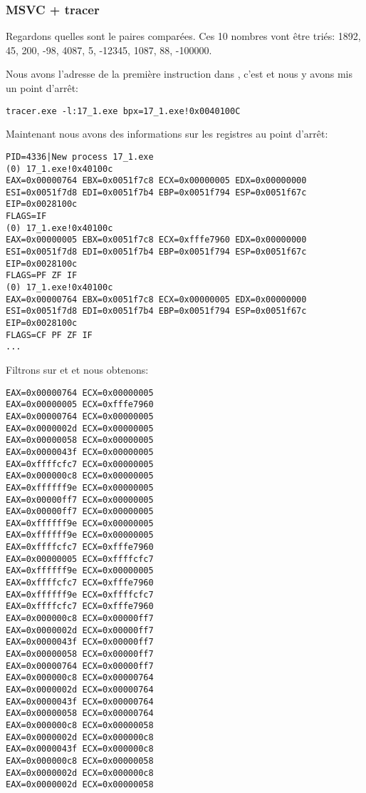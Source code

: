 \subsubsection{MSVC + tracer}

Regardons quelles sont le paires comparées.
Ces 10 nombres vont être triés:
1892, 45, 200, -98, 4087, 5, -12345, 1087, 88, -100000.

Nous avons l'adresse de la première instruction \CMP dans \comp, c'est 
et nous y avons mis un point d'arrêt:

\begin{lstlisting}
tracer.exe -l:17_1.exe bpx=17_1.exe!0x0040100C
\end{lstlisting}

Maintenant nous avons des informations sur les registres au point d'arrêt:

\begin{lstlisting}
PID=4336|New process 17_1.exe
(0) 17_1.exe!0x40100c
EAX=0x00000764 EBX=0x0051f7c8 ECX=0x00000005 EDX=0x00000000
ESI=0x0051f7d8 EDI=0x0051f7b4 EBP=0x0051f794 ESP=0x0051f67c
EIP=0x0028100c
FLAGS=IF
(0) 17_1.exe!0x40100c
EAX=0x00000005 EBX=0x0051f7c8 ECX=0xfffe7960 EDX=0x00000000
ESI=0x0051f7d8 EDI=0x0051f7b4 EBP=0x0051f794 ESP=0x0051f67c
EIP=0x0028100c
FLAGS=PF ZF IF
(0) 17_1.exe!0x40100c
EAX=0x00000764 EBX=0x0051f7c8 ECX=0x00000005 EDX=0x00000000
ESI=0x0051f7d8 EDI=0x0051f7b4 EBP=0x0051f794 ESP=0x0051f67c
EIP=0x0028100c
FLAGS=CF PF ZF IF
...
\end{lstlisting}

Filtrons sur  et  et nous obtenons:

\begin{lstlisting}
EAX=0x00000764 ECX=0x00000005
EAX=0x00000005 ECX=0xfffe7960
EAX=0x00000764 ECX=0x00000005
EAX=0x0000002d ECX=0x00000005
EAX=0x00000058 ECX=0x00000005
EAX=0x0000043f ECX=0x00000005
EAX=0xffffcfc7 ECX=0x00000005
EAX=0x000000c8 ECX=0x00000005
EAX=0xffffff9e ECX=0x00000005
EAX=0x00000ff7 ECX=0x00000005
EAX=0x00000ff7 ECX=0x00000005
EAX=0xffffff9e ECX=0x00000005
EAX=0xffffff9e ECX=0x00000005
EAX=0xffffcfc7 ECX=0xfffe7960
EAX=0x00000005 ECX=0xffffcfc7
EAX=0xffffff9e ECX=0x00000005
EAX=0xffffcfc7 ECX=0xfffe7960
EAX=0xffffff9e ECX=0xffffcfc7
EAX=0xffffcfc7 ECX=0xfffe7960
EAX=0x000000c8 ECX=0x00000ff7
EAX=0x0000002d ECX=0x00000ff7
EAX=0x0000043f ECX=0x00000ff7
EAX=0x00000058 ECX=0x00000ff7
EAX=0x00000764 ECX=0x00000ff7
EAX=0x000000c8 ECX=0x00000764
EAX=0x0000002d ECX=0x00000764
EAX=0x0000043f ECX=0x00000764
EAX=0x00000058 ECX=0x00000764
EAX=0x000000c8 ECX=0x00000058
EAX=0x0000002d ECX=0x000000c8
EAX=0x0000043f ECX=0x000000c8
EAX=0x000000c8 ECX=0x00000058
EAX=0x0000002d ECX=0x000000c8
EAX=0x0000002d ECX=0x00000058
\end{lstlisting}

